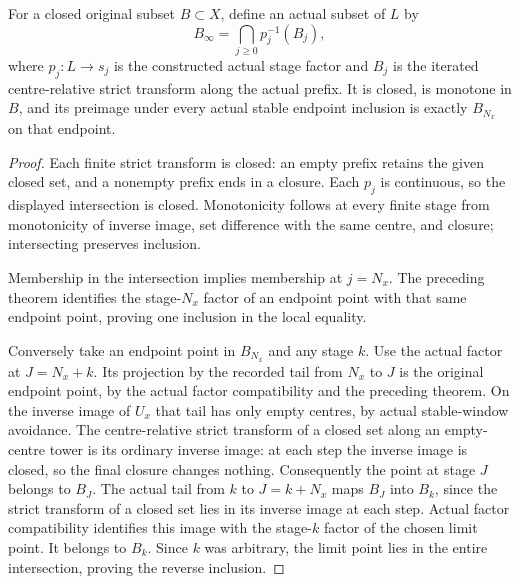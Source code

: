 \begin{theorem}
\label{hir:actual-lf-limit-centre-relative-strict-dictionary}
\leanok
For a closed original subset $B\subset X$, define an actual subset of $L$ by
\[
 B_\infty=\bigcap_{j\geq0}p_j^{-1}(B_j),
\]
where $p_j:L\to s_j$ is the constructed actual stage factor and $B_j$ is
the iterated centre-relative strict transform along the actual prefix.
It is closed, is monotone in $B$, and its preimage under every actual
stable endpoint inclusion is exactly $B_{N_x}$ on that endpoint.
\end{theorem}
\begin{proof}
Each finite strict transform is closed: an empty prefix retains the given
closed set, and a nonempty prefix ends in a closure. Each $p_j$ is
continuous, so the displayed intersection is closed. Monotonicity follows
at every finite stage from monotonicity of inverse image, set difference
with the same centre, and closure; intersecting preserves inclusion.

Membership in the intersection implies membership at $j=N_x$. The preceding
theorem identifies the stage-$N_x$ factor of an endpoint point with that
same endpoint point, proving one inclusion in the local equality.

Conversely take an endpoint point in $B_{N_x}$ and any stage $k$. Use the
actual factor at $J=N_x+k$. Its projection by the recorded tail from
$N_x$ to $J$ is the original endpoint point, by the actual factor
compatibility and the preceding theorem. On the inverse image of $U_x$
that tail has only empty centres, by actual stable-window avoidance.
The centre-relative strict transform of a closed set along an empty-centre
tower is its ordinary inverse image: at each step the inverse image is
closed, so the final closure changes nothing. Consequently the point at
stage $J$ belongs to $B_J$. The actual tail from $k$ to $J=k+N_x$ maps
$B_J$ into $B_k$, since the strict transform of a closed set lies in its
inverse image at each step. Actual factor compatibility identifies this
image with the stage-$k$ factor of the chosen limit point. It belongs to
$B_k$. Since $k$ was arbitrary, the limit point lies in the entire
intersection, proving the reverse inclusion.
\end{proof}

